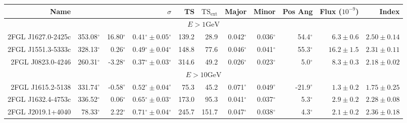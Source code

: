 \documentclass[12pt,preprint]{aastex}
\newcommand{\gev}{\text{GeV}\xspace}
\newcommand{\tsext}{{\ensuremath{\text{TS}_\text{ext}}}\xspace}
\newcommand{\glon}{\text{GLON}\xspace}
\newcommand{\glat}{\text{GLAT}\xspace}
\renewcommand{\deg}{\ensuremath{^\circ}\xspace}
\begin{document}


\clearpage
\begin{table}
  \begin{centering}
    \begin{tabular}{r|rrrrrrrrrr}
      \hline
      \hline
      Name                 &          \glon &          \glat &                    $\sigma$ &       TS &   $\tsext$ &      Major &      Minor &    Pos Ang &      Flux ($10^{-9}$) &                 Index \\
      \hline
      \multicolumn{11}{c}{$E > 1\gev$} \\
      \hline
      2FGL J1627.0-2425c   &     353.08\deg &      16.80\deg & $  0.41\deg \pm   0.05\deg$ &    139.2 &       28.9 &  0.042\deg &  0.036\deg &   54.4\deg & $    6.3 \pm     0.6$ & $   2.50 \pm    0.14$ \\
      2FGL J1551.3-5333c   &     328.13\deg &       0.26\deg & $  0.49\deg \pm   0.04\deg$ &    148.8 &       77.6 &  0.046\deg &  0.041\deg &   55.3\deg & $   16.2 \pm     1.5$ & $   2.31 \pm    0.11$ \\
      2FGL J0823.0-4246    &     260.31\deg &      -3.28\deg & $  0.37\deg \pm   0.03\deg$ &    314.6 &       49.2 &  0.026\deg &  0.023\deg &    5.0\deg & $    8.3 \pm     0.3$ & $   2.18 \pm    0.02$ \\
      \hline
      \multicolumn{11}{c}{$E > 10\gev$} \\
      \hline
      2FGL J1615.2-5138          &     331.74\deg &      -0.58\deg & $  0.52\deg \pm   0.04\deg$ &     75.3 &       45.2 &  0.071\deg &  0.049\deg &  -21.9\deg & $    1.3 \pm     0.2$ & $   1.75 \pm    0.25$ \\
      2FGL J1632.4-4753c         &     336.52\deg &       0.06\deg & $  0.65\deg \pm   0.03\deg$ &    173.0 &       95.3 &  0.041\deg &  0.037\deg &    5.3\deg & $    2.9 \pm     0.2$ & $   2.28 \pm    0.08$ \\
      2FGL J2019.1+4040          &      78.33\deg &       2.22\deg & $  0.71\deg \pm   0.04\deg$ &    245.7 &      151.7 &  0.047\deg &  0.038\deg &    4.3\deg & $    2.1 \pm     0.2$ & $   2.36 \pm    0.18$ \\

\end{tabular}
\end{centering}
\end{table}
\end{document}
